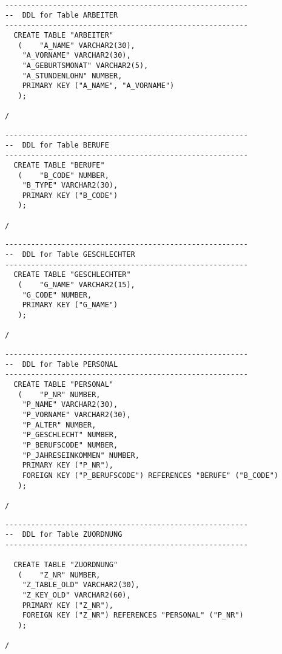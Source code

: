 \documentclass{scrartcl}
\begin{document}
\begin{lstlisting}
--------------------------------------------------------
--  DDL for Table ARBEITER
--------------------------------------------------------
  CREATE TABLE "ARBEITER" 
   (	"A_NAME" VARCHAR2(30), 
	"A_VORNAME" VARCHAR2(30), 
	"A_GEBURTSMONAT" VARCHAR2(5), 
	"A_STUNDENLOHN" NUMBER,
	PRIMARY KEY ("A_NAME", "A_VORNAME")
   );

/
\end{lstlisting}

\begin{lstlisting}
--------------------------------------------------------
--  DDL for Table BERUFE
--------------------------------------------------------
  CREATE TABLE "BERUFE" 
   (	"B_CODE" NUMBER, 
	"B_TYPE" VARCHAR2(30),
	PRIMARY KEY ("B_CODE")
   );

/
\end{lstlisting}

\begin{lstlisting}
--------------------------------------------------------
--  DDL for Table GESCHLECHTER
--------------------------------------------------------
  CREATE TABLE "GESCHLECHTER" 
   (	"G_NAME" VARCHAR2(15), 
	"G_CODE" NUMBER,
	PRIMARY KEY ("G_NAME")
   );

/
\end{lstlisting}

\begin{lstlisting}
--------------------------------------------------------
--  DDL for Table PERSONAL
--------------------------------------------------------
  CREATE TABLE "PERSONAL" 
   (	"P_NR" NUMBER, 
	"P_NAME" VARCHAR2(30), 
	"P_VORNAME" VARCHAR2(30), 
	"P_ALTER" NUMBER, 
	"P_GESCHLECHT" NUMBER, 
	"P_BERUFSCODE" NUMBER, 
	"P_JAHRESEINKOMMEN" NUMBER,
	PRIMARY KEY ("P_NR"),
	FOREIGN KEY ("P_BERUFSCODE") REFERENCES "BERUFE" ("B_CODE")
   );

/
\end{lstlisting}

\begin{lstlisting}
--------------------------------------------------------
--  DDL for Table ZUORDNUNG
--------------------------------------------------------

  CREATE TABLE "ZUORDNUNG" 
   (	"Z_NR" NUMBER, 
	"Z_TABLE_OLD" VARCHAR2(30), 
	"Z_KEY_OLD" VARCHAR2(60),
	PRIMARY KEY ("Z_NR"),
	FOREIGN KEY ("Z_NR") REFERENCES "PERSONAL" ("P_NR")
   );

/
\end{lstlisting}
\end{document}
